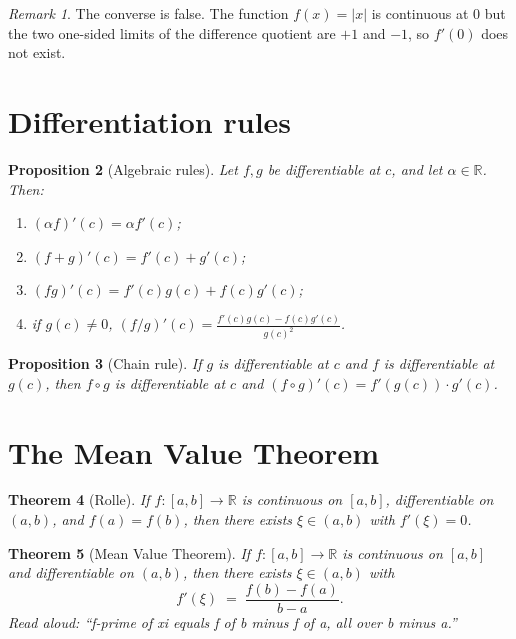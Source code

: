 \documentclass[11pt]{article}
\newtheorem{theorem}{Theorem}
\newtheorem{proposition}[theorem]{Proposition}
\theoremstyle{definition}
\theoremstyle{remark}
\newtheorem{remark}[theorem]{Remark}
\begin{document}
\begin{remark}
The converse is false. The function $f(x) = |x|$ is continuous at $0$ but the
two one-sided limits of the difference quotient are $+1$ and $-1$, so $f'(0)$
does not exist.
\end{remark}

\section{Differentiation rules}

\begin{proposition}[Algebraic rules]
Let $f, g$ be differentiable at $c$, and let $\alpha \in \mathbb{R}$. Then:
\begin{enumerate}
\item $(\alpha f)'(c) = \alpha f'(c)$;
\item $(f + g)'(c) = f'(c) + g'(c)$;
\item $(f g)'(c) = f'(c) g(c) + f(c) g'(c)$;
\item if $g(c) \neq 0$,
$\displaystyle (f/g)'(c) = \frac{f'(c) g(c) - f(c) g'(c)}{g(c)^2}$.
\end{enumerate}
\end{proposition}

\begin{proposition}[Chain rule]
If $g$ is differentiable at $c$ and $f$ is differentiable at $g(c)$, then
$f \circ g$ is differentiable at $c$ and
$(f \circ g)'(c) = f'(g(c)) \cdot g'(c)$.
\end{proposition}

\section{The Mean Value Theorem}

\begin{theorem}[Rolle]
If $f : [a, b] \to \mathbb{R}$ is continuous on $[a, b]$, differentiable on
$(a, b)$, and $f(a) = f(b)$, then there exists $\xi \in (a, b)$ with
$f'(\xi) = 0$.
\end{theorem}

\begin{theorem}[Mean Value Theorem]
If $f : [a, b] \to \mathbb{R}$ is continuous on $[a, b]$ and differentiable on
$(a, b)$, then there exists $\xi \in (a, b)$ with
\[
f'(\xi) \;=\; \frac{f(b) - f(a)}{b - a}.
\]
\emph{Read aloud:} ``f-prime of xi equals f of b minus f of a, all over b minus a.''
\end{theorem}
\end{document}
